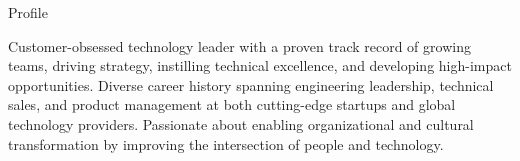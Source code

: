 \documentclass{resume} %
\begin{document}
\vspace{-1em}
\begin{rSection}{Profile}
  
  Customer-obsessed technology leader with a proven track record of growing teams, driving strategy, instilling technical excellence, and developing high-impact opportunities. Diverse career history spanning engineering leadership, technical sales, and product management at both cutting-edge startups and global technology providers. Passionate about enabling organizational and cultural transformation by improving the intersection of people and technology.
  
\end{rSection}

\end{document}
